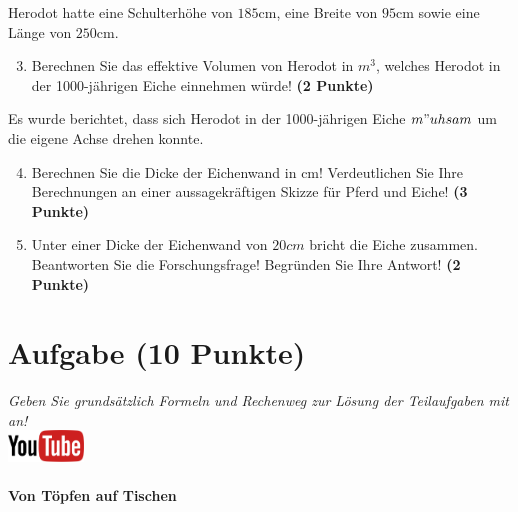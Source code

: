 \documentclass[a4paper, 10pt]{scrartcl}\usepackage[]{graphicx}\usepackage[]{xcolor}
\begin{document}
Herodot hatte eine Schulterh{\"o}he von $185$cm, eine Breite von
$95$cm sowie eine L{\"a}nge von  $250$cm.

\begin{enumerate}
  \setcounter{enumi}{2}
\item Berechnen Sie das effektive Volumen von Herodot in $m^3$, welches
  Herodot in der 1000-j{\"a}hrigen Eiche einnehmen w{\"u}rde! \textbf{(2 Punkte)}
\end{enumerate}

Es wurde berichtet, dass sich Herodot in der 1000-j{\"a}hrigen Eiche
$m{"u}hsam$ um die eigene Achse drehen konnte.

\begin{enumerate}
  \setcounter{enumi}{3}
\item Berechnen Sie die Dicke der Eichenwand in cm! Verdeutlichen Sie Ihre
  Berechnungen an einer aussagekr{\"a}ftigen Skizze f{\"u}r Pferd und Eiche! \textbf{(3 Punkte)} 
\item Unter einer Dicke der Eichenwand von $20cm$ bricht
  die Eiche zusammen. Beantworten Sie die Forschungsfrage! Begr{\"u}nden Sie
  Ihre Antwort! \textbf{(2 Punkte)} 
\end{enumerate}
 
\clearpage

\section{Aufgabe \hfill (10 Punkte)}

\textit{Geben Sie grunds{\"a}tzlich Formeln und Rechenweg zur L{\"o}sung der
  Teilaufgaben mit an!} \\[1Ex]

\hfill\href{https://youtu.be/57B-yYoFSk0}{\includegraphics[width =
  2cm]{img/youtube}} %
\hspace{2Ex}

\paragraph{Von T{\"o}pfen auf Tischen}
\end{document}
